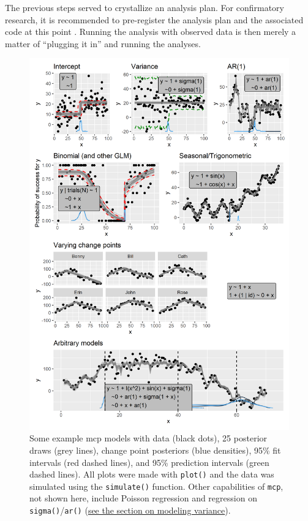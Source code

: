 \documentclass[
  american,
]{article}
\begin{document}
The previous steps served to crystallize an analysis plan. For confirmatory research, it is recommended to pre-register the analysis plan and the associated code at this point \citep{munafo2017}. Running the analysis with observed data is then merely a matter of ``plugging it in'' and running the analyses.



\begin{figure}
\includegraphics[width=5.6in]{all_plots} \caption{Some example mcp models with data (black dots), 25 posterior draws (grey lines), change point posteriors (blue densities), 95\% fit intervals (red dashed lines), and 95\% prediction intervals (green dashed lines). All plots were made with \texttt{plot()} and the data was simulated using the \texttt{simulate()} function. Other capabilities of \texttt{mcp}, not shown here, include Poisson regression and regression on \texttt{sigma()}/\texttt{ar()} (\protect\hyperlink{sigmaar-api}{see the section on modeling variance}).}\label{fig:allmodels}
\end{figure}
\end{document}
